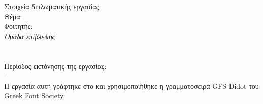 
\pagestyle{empty}
\begin{center}
\Large{Στοιχεία διπλωματικής εργασίας}\\[1cm]
{\large Θέμα:}
\textbf{\large \doctitle}\\[1cm]
\large {Φοιτητής: \textbf{\nomme}\\[1cm]
\emph{\large{Ομάδα επίβλεψης}}\\[0.3cm]
\textbf{\supname}\\
\textbf{\didaktorikosOnoma}\\[1cm]
Περίοδος εκπόνησης της εργασίας:\\ {\startmonthyear} - {\telosmonthyear}\\[1cm]
Η εργασία αυτή γράφτηκε στο \XeLaTeX{} και χρησιμοποιήθηκε η γραμματοσειρά GFS Didot του Greek Font Society.}
\end{center}